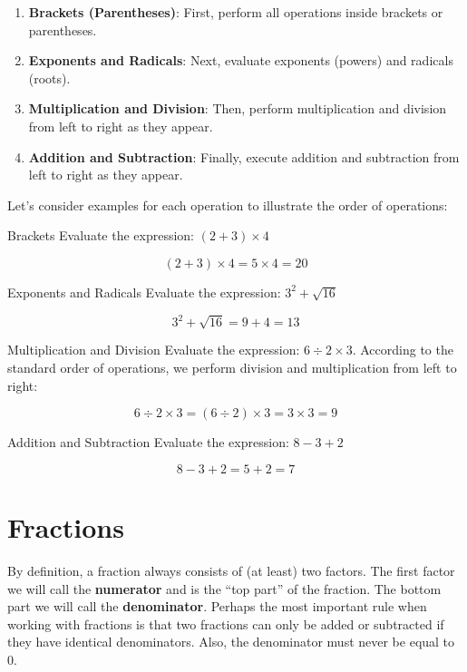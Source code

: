 \begin{enumerate}
    \item \textbf{Brackets (Parentheses)}: First, perform all operations inside brackets or parentheses.
    \item \textbf{Exponents and Radicals}: Next, evaluate exponents (powers) and radicals (roots).
    \item \textbf{Multiplication and Division}: Then, perform multiplication and division from left to right as they appear.
    \item \textbf{Addition and Subtraction}: Finally, execute addition and subtraction from left to right as they appear.
\end{enumerate}

Let's consider examples for each operation to illustrate the order of operations:

\begin{example} Brackets \newline
Evaluate the expression: \((2 + 3) \times 4\)

\[
(2 + 3) \times 4 = 5 \times 4 = 20
\]
\end{example}

\begin{example} Exponents and Radicals \newline
Evaluate the expression: \(3^2 + \sqrt{16}\)

\[
3^2 + \sqrt{16} = 9 + 4 = 13
\]
\end{example}

\begin{example} Multiplication and Division \newline
Evaluate the expression: \(6 \div 2 \times 3\). According to the standard order of operations, we perform division and multiplication from left to right:

\[
6 \div 2 \times 3 = (6 \div 2) \times 3 = 3 \times 3 = 9
\]

\end{example}

\begin{example} Addition and Subtraction \newline
Evaluate the expression: \(8 - 3 + 2\)

\[
8 - 3 + 2 = 5 + 2 = 7
\]
\end{example}

\section{Fractions}
By definition, a fraction always consists of (at least) two factors. The first factor we will call the \textbf{numerator} and is the “top part” of the fraction. The bottom part we will call the \textbf{denominator}. Perhaps the most important rule when working with fractions is that two fractions can only be added or subtracted if they have identical denominators. Also, the denominator must never be equal to 0.

